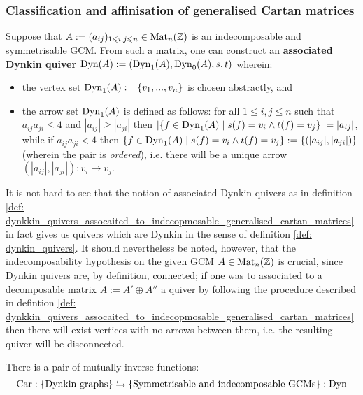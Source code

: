         \subsubsection{Classification and affinisation of generalised Cartan matrices}
            \begin{definition} \label{def: dynkkin_quivers_assocaited_to_indecopmosable_generalised_cartan_matrices}
                Suppose that $A := (a_{ij})_{1 \leqslant i, j \leqslant n} \in \mathrm{Mat}_n(\mathbb{Z})$ is an indecomposable and symmetrisable GCM. From such a matrix, one can construct an \textbf{associated Dynkin quiver} $\mathrm{Dyn}(A) := (\mathrm{Dyn}_1(A), \mathrm{Dyn}_0(A), s, t)$ wherein:
                    \begin{itemize}
                        \item the vertex set $\mathrm{Dyn}_1(A) := \{v_1, ..., v_n\}$ is chosen abstractly, and
                        \item the arrow set $\mathrm{Dyn}_1(A)$ is defined as follows: for all $1 \leq i, j \leq n$ such that $a_{ij} a_{ji} \leq 4$ and $|a_{ij}| \geq |a_{ji}|$ then $|\{f \in \mathrm{Dyn}_1(A) \mid s(f) = v_i \wedge t(f) = v_j\}| = |a_{ij}|$, while if $a_{ij} a_{ji} < 4$ then $\{f \in \mathrm{Dyn}_1(A) \mid s(f) = v_i \wedge t(f) = v_j\} := \{ (|a_{ij}|, |a_{ji}|) \}$ (wherein the pair is \textit{ordered}), i.e. there will be a unique arrow $(|a_{ij}|, |a_{ji}|): v_i \to v_j$. 
                    \end{itemize}
            \end{definition}
            \begin{remark}
                It is not hard to see that the notion of associated Dynkin quivers as in definition \ref{def: dynkkin_quivers_assocaited_to_indecopmosable_generalised_cartan_matrices} in fact gives us quivers which are Dynkin in the sense of definition \ref{def: dynkin_quivers}. It should nevertheless be noted, however, that the indecomposability hypothesis on the given GCM $A \in \mathrm{Mat}_n(\mathbb{Z})$ is crucial, since Dynkin quivers are, by definition, connected; if one was to associated to a decomposable matrix $A := A' \oplus A''$ a quiver by following the procedure described in defintion \ref{def: dynkkin_quivers_assocaited_to_indecopmosable_generalised_cartan_matrices} then there will exist vertices with no arrows between them, i.e. the resulting quiver will be disconnected. 
            \end{remark}
            \begin{remark} \label{remark: dynkin_quivers_and_their_cartan_matrices}
                There is a pair of mutually inverse functions:
                    $$\mathrm{Car}: \{ \text{Dynkin graphs} \} \leftrightarrows \{ \text{Symmetrisable and indecomposable GCMs} \}: \mathrm{Dyn}$$
            \end{remark}
